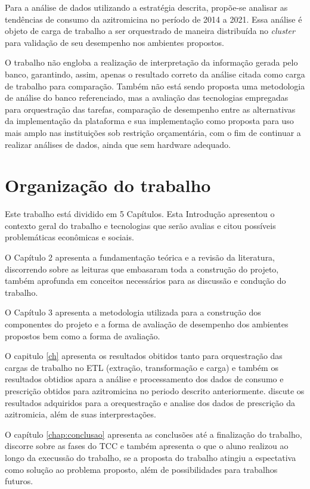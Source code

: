Para a análise de dados utilizando a estratégia descrita, propõe-se analisar as tendências de consumo da azitromicina no período de 2014 a 2021. Essa análise é objeto de carga de trabalho a ser orquestrado de maneira distribuída no \emph{cluster} para validação de seu desempenho nos ambientes propostos.

O trabalho não engloba a realização de interpretação da informação gerada pelo banco, garantindo, assim, apenas o resultado correto da análise citada como carga de trabalho para comparação. Também não está sendo proposta uma metodologia de análise do banco referenciado, mas a avaliação das tecnologias empregadas para orquestração das tarefas, comparação de desempenho entre as alternativas da implementação da plataforma e sua implementação como proposta para uso mais amplo nas instituições sob restrição orçamentária, com o fim de continuar a realizar análises de dados, ainda que sem hardware adequado.


\section{Organização do trabalho}
\label{sec:organizacaoTrabalho}

Este trabalho está dividido em 5 Capítulos. Esta Introdução apresentou o contexto geral do trabalho e tecnologias que serão avalias e citou possíveis problemáticas econômicas e sociais. 

O Capítulo 2 apresenta a fundamentação teórica e a revisão da literatura, discorrendo sobre as leituras que embasaram toda a construção do projeto, também aprofunda em conceitos necessários para as discussão e condução do trabalho. 

O Capítulo 3 apresenta a  metodologia utilizada para a construção dos componentes do projeto e a forma de avaliação de desempenho dos ambientes propostos bem como a forma de avaliação. 

O capitulo \ref{ch} apresenta os resultados obitidos tanto para orquestração das cargas de trabalho no ETL (extração, transformação e carga) e também os resultados obtidios apara a análise e processamento dos dados de consumo e prescrição obtidos para azitromicina no periodo descrito anteriormente.
discute os resultados adquiridos para a orequestração e analise dos dados de prescrição da azitromicia, além de suas interprestações. 

O capítulo \ref{chap:conclusao} apresenta as conclusões até a finalização do trabalho, discorre sobre as fases do TCC e também apresenta o que o aluno realizou ao longo da execussão do trabalho, se a proposta do trabalho atingiu a espectativa como solução ao problema  proposto, além de possibilidades para trabalhos futuros. 